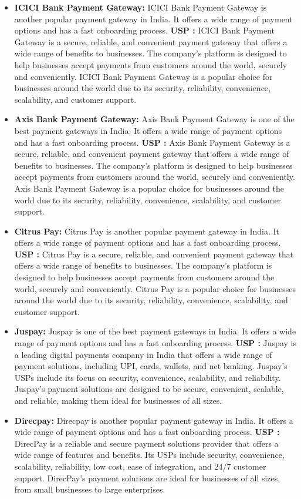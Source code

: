 \begin{enumerate}
\begin{itemize}
    \item \textbf{ICICI Bank Payment Gateway:} ICICI Bank Payment Gateway is another popular payment gateway in India. It offers a wide range of payment options and has a fast onboarding process.
    \textbf{USP : }ICICI Bank Payment Gateway is a secure, reliable, and convenient payment gateway that offers a wide range of benefits to businesses. The company's platform is designed to help businesses accept payments from customers around the world, securely and conveniently. ICICI Bank Payment Gateway is a popular choice for businesses around the world due to its security, reliability, convenience, scalability, and customer support.
    \item \textbf{Axis Bank Payment Gateway:} Axis Bank Payment Gateway is one of the best payment gateways in India. It offers a wide range of payment options and has a fast onboarding process.
    \textbf{USP : }Axis Bank Payment Gateway is a secure, reliable, and convenient payment gateway that offers a wide range of benefits to businesses. The company's platform is designed to help businesses accept payments from customers around the world, securely and conveniently. Axis Bank Payment Gateway is a popular choice for businesses around the world due to its security, reliability, convenience, scalability, and customer support.
    \item \textbf{Citrus Pay:} Citrus Pay is another popular payment gateway in India. It offers a wide range of payment options and has a fast onboarding process.
    \textbf{USP : }Citrus Pay is a secure, reliable, and convenient payment gateway that offers a wide range of benefits to businesses. The company's platform is designed to help businesses accept payments from customers around the world, securely and conveniently. Citrus Pay is a popular choice for businesses around the world due to its security, reliability, convenience, scalability, and customer support.
    \item \textbf{Juspay:} Juspay is one of the best payment gateways in India. It offers a wide range of payment options and has a fast onboarding process.
    \textbf{USP : }Juspay is a leading digital payments company in India that offers a wide range of payment solutions, including UPI, cards, wallets, and net banking. Juspay's USPs include its focus on security, convenience, scalability, and reliability. Juspay's payment solutions are designed to be secure, convenient, scalable, and reliable, making them ideal for businesses of all sizes.
    \item \textbf{Direcpay:} Direcpay is another popular payment gateway in India. It offers a wide range of payment options and has a fast onboarding process.
    \textbf{USP : }DirecPay is a reliable and secure payment solutions provider that offers a wide range of features and benefits. Its USPs include security, convenience, scalability, reliability, low cost, ease of integration, and 24/7 customer support. DirecPay's payment solutions are ideal for businesses of all sizes, from small businesses to large enterprises.



\end{itemize}
\end{enumerate}
